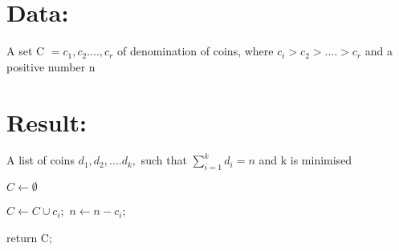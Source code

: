 \documentclass[a4paper,12ptx]{article}
\begin{document}
	\section{Data:}
	A set C $={c_1,c_2....,c_r}$ of denomination of coins, where $c_i > c_2 > .... > c_r$ and a positive number n
	\section{Result:}
	A list of coins $d_1,d_2,....d_k,$ such that $\sum_{i=1}^{k} d_i = n$ and k is minimised
	\begin{algorithm}
		$C \leftarrow \emptyset$
		{
			{
				$C \leftarrow C \cup {c_i};$
				$n \leftarrow n - c_i;$
				
			}
		}
	return C;
	\end{algorithm}
\end{document}

